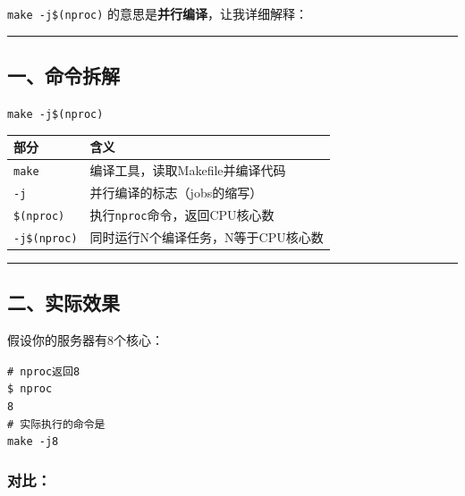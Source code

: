 \documentclass[11pt, a4paper]{article}
\begin{document}
\begin{aibox}
\texttt{make -j\$(nproc)} 的意思是\textbf{并行编译}，让我详细解释：

\begin{center}\rule{\textwidth}{0.4pt}\end{center}

\subsection*{一、命令拆解}

\begin{tcolorbox}[colback=white,colframe=gray!50!white,boxrule=0.5pt,arc=2pt,left=5pt,right=5pt,top=5pt,bottom=5pt]
\texttt{make -j\$(nproc)}
\end{tcolorbox}

\vspace{0.5em}
\begin{tabularx}{\textwidth}{@{} l X @{}}
\toprule
部分 & 含义 \\
\midrule
\texttt{make} & 编译工具，读取Makefile并编译代码 \\
\texttt{-j} & 并行编译的标志（jobs的缩写） \\
\texttt{\$(nproc)} & 执行\texttt{nproc}命令，返回CPU核心数 \\
\texttt{-j\$(nproc)} & 同时运行N个编译任务，N等于CPU核心数 \\
\bottomrule
\end{tabularx}
\vspace{0.5em}

\begin{center}\rule{\textwidth}{0.4pt}\end{center}

\subsection*{二、实际效果}

假设你的服务器有8个核心：

\begin{tcolorbox}[colback=white,colframe=gray!50!white,boxrule=0.5pt,arc=2pt,left=5pt,right=5pt,top=5pt,bottom=5pt]
\texttt{\# nproc返回8}\\
\texttt{\$ nproc}\\
\texttt{8}\\[0.5em]
\texttt{\# 实际执行的命令是}\\
\texttt{make -j8}
\end{tcolorbox}

\subsubsection*{对比：}


\end{aibox}
\end{document}
